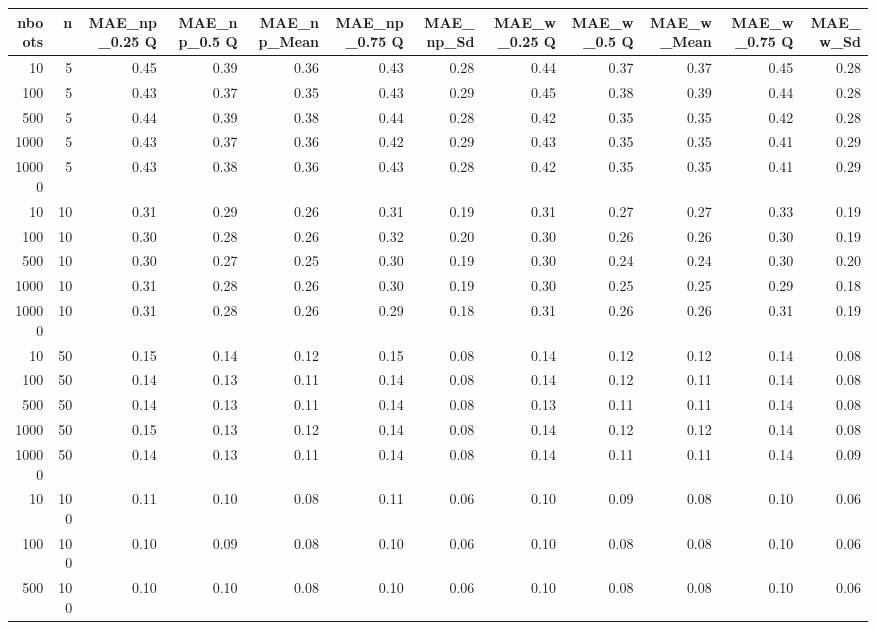\begin{table}[ht]
\centering
\begin{tabular}{rrrrrrrrrrrr}
  \hline
nboots & n & MAE\_np\_0.25 Q & MAE\_np\_0.5 Q & MAE\_np\_Mean & MAE\_np\_0.75 Q & MAE\_np\_Sd & MAE\_w\_0.25 Q & MAE\_w\_0.5 Q & MAE\_w\_Mean & MAE\_w\_0.75 Q & MAE\_w\_Sd \\ 
  \hline
10 & 5 & 0.45 & 0.39 & 0.36 & 0.43 & 0.28 & 0.44 & 0.37 & 0.37 & 0.45 & 0.28 \\ 
  100 & 5 & 0.43 & 0.37 & 0.35 & 0.43 & 0.29 & 0.45 & 0.38 & 0.39 & 0.44 & 0.28 \\ 
  500 & 5 & 0.44 & 0.39 & 0.38 & 0.44 & 0.28 & 0.42 & 0.35 & 0.35 & 0.42 & 0.28 \\ 
  1000 & 5 & 0.43 & 0.37 & 0.36 & 0.42 & 0.29 & 0.43 & 0.35 & 0.35 & 0.41 & 0.29 \\ 
  10000 & 5 & 0.43 & 0.38 & 0.36 & 0.43 & 0.28 & 0.42 & 0.35 & 0.35 & 0.41 & 0.29 \\ 
  10 & 10 & 0.31 & 0.29 & 0.26 & 0.31 & 0.19 & 0.31 & 0.27 & 0.27 & 0.33 & 0.19 \\ 
  100 & 10 & 0.30 & 0.28 & 0.26 & 0.32 & 0.20 & 0.30 & 0.26 & 0.26 & 0.30 & 0.19 \\ 
  500 & 10 & 0.30 & 0.27 & 0.25 & 0.30 & 0.19 & 0.30 & 0.24 & 0.24 & 0.30 & 0.20 \\ 
  1000 & 10 & 0.31 & 0.28 & 0.26 & 0.30 & 0.19 & 0.30 & 0.25 & 0.25 & 0.29 & 0.18 \\ 
  10000 & 10 & 0.31 & 0.28 & 0.26 & 0.29 & 0.18 & 0.31 & 0.26 & 0.26 & 0.31 & 0.19 \\ 
  10 & 50 & 0.15 & 0.14 & 0.12 & 0.15 & 0.08 & 0.14 & 0.12 & 0.12 & 0.14 & 0.08 \\ 
  100 & 50 & 0.14 & 0.13 & 0.11 & 0.14 & 0.08 & 0.14 & 0.12 & 0.11 & 0.14 & 0.08 \\ 
  500 & 50 & 0.14 & 0.13 & 0.11 & 0.14 & 0.08 & 0.13 & 0.11 & 0.11 & 0.14 & 0.08 \\ 
  1000 & 50 & 0.15 & 0.13 & 0.12 & 0.14 & 0.08 & 0.14 & 0.12 & 0.12 & 0.14 & 0.08 \\ 
  10000 & 50 & 0.14 & 0.13 & 0.11 & 0.14 & 0.08 & 0.14 & 0.11 & 0.11 & 0.14 & 0.09 \\ 
  10 & 100 & 0.11 & 0.10 & 0.08 & 0.11 & 0.06 & 0.10 & 0.09 & 0.08 & 0.10 & 0.06 \\ 
  100 & 100 & 0.10 & 0.09 & 0.08 & 0.10 & 0.06 & 0.10 & 0.08 & 0.08 & 0.10 & 0.06 \\ 
  500 & 100 & 0.10 & 0.10 & 0.08 & 0.10 & 0.06 & 0.10 & 0.08 & 0.08 & 0.10 & 0.06 \\ 

\end{tabular}
\end{table}
